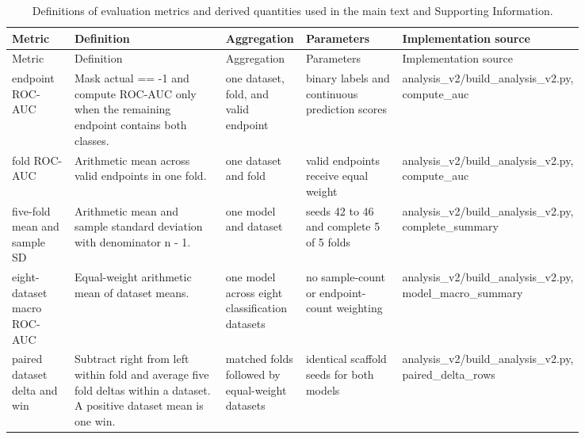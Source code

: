 \documentclass[journal=jcisd8,manuscript=article]{achemso}
\begin{document}
\begin{landscape}
\begingroup
\scriptsize
\setlength{\tabcolsep}{3pt}
\renewcommand{\arraystretch}{0.96}
\begin{longtable}{
>{\raggedright\arraybackslash}p{0.11\linewidth}
>{\raggedright\arraybackslash}p{0.27\linewidth}
>{\raggedright\arraybackslash}p{0.14\linewidth}
>{\raggedright\arraybackslash}p{0.17\linewidth}
>{\raggedright\arraybackslash}p{0.15\linewidth}}
\caption{Definitions of evaluation metrics and derived quantities used in the main text and Supporting Information.}
\label{tab:si-metric-definitions}\\
\toprule
Metric & Definition & Aggregation & Parameters & Implementation source \\
\midrule
\endfirsthead
\toprule
Metric & Definition & Aggregation & Parameters & Implementation source \\
\midrule
\endhead
endpoint ROC-AUC & Mask actual == -1 and compute ROC-AUC only when the remaining endpoint contains both classes. & one dataset, fold, and valid endpoint & binary labels and continuous prediction scores & {\ttfamily\tiny analysis\_\allowbreak{}v2/\allowbreak{}build\_\allowbreak{}analysis\_\allowbreak{}v2.py,\allowbreak{} compute\_\allowbreak{}auc} \\
fold ROC-AUC & Arithmetic mean across valid endpoints in one fold. & one dataset and fold & valid endpoints receive equal weight & {\ttfamily\tiny analysis\_\allowbreak{}v2/\allowbreak{}build\_\allowbreak{}analysis\_\allowbreak{}v2.py,\allowbreak{} compute\_\allowbreak{}auc} \\
five-fold mean and sample SD & Arithmetic mean and sample standard deviation with denominator n - 1. & one model and dataset & seeds 42 to 46 and complete 5 of 5 folds & {\ttfamily\tiny analysis\_\allowbreak{}v2/\allowbreak{}build\_\allowbreak{}analysis\_\allowbreak{}v2.py,\allowbreak{} complete\_\allowbreak{}summary} \\
eight-dataset macro ROC-AUC & Equal-weight arithmetic mean of dataset means. & one model across eight classification datasets & no sample-count or endpoint-count weighting & {\ttfamily\tiny analysis\_\allowbreak{}v2/\allowbreak{}build\_\allowbreak{}analysis\_\allowbreak{}v2.py,\allowbreak{} model\_\allowbreak{}macro\_\allowbreak{}summary} \\
paired dataset delta and win & Subtract right from left within fold and average five fold deltas within a dataset. A positive dataset mean is one win. & matched folds followed by equal-weight datasets & identical scaffold seeds for both models & {\ttfamily\tiny analysis\_\allowbreak{}v2/\allowbreak{}build\_\allowbreak{}analysis\_\allowbreak{}v2.py,\allowbreak{} paired\_\allowbreak{}delta\_\allowbreak{}rows} \\

\end{longtable}
\end{landscape}
\end{document}
